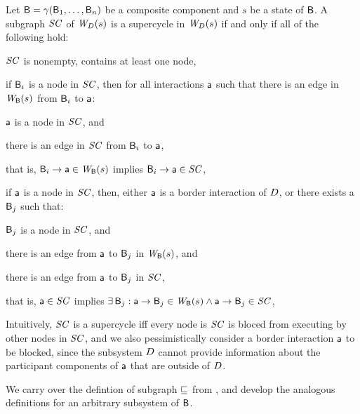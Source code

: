 \begin{definition}
\label{defn:supercycleLoc} 
Let $\B = \gamma(\B_1,\dots,\B_n)$ be a composite component and $s$ be a state of $\B$.
A subgraph $\SC$ of  $\lwfg{B}{s}{\DS}$ is a supercycle in $\lwfg{B}{s}{\DS}$ if and only if all of the following hold:
\begin{nlst1}
   \item $\SC$ is nonempty, \ie contains at least one node,

   \item if $\B_i$ is a node in $\SC$, then for all interactions $\act$ such that
there is an edge in $\wfg{\B}{s}$ from $\B_i$ to $\act$:
      \begin{nlst2}
      \item $\act$ is a node in $\SC$, and 
      \item there is an edge in $\SC$ from $\B_i$ to $\act$,
      \end{nlst2}
that is, $\B_i \ar \act \in \wfg{\B}{s}$ implies $\B_i \ar \act \in \SC$,

   \item 
if $\act$ is a node in $\SC$, then, either $\act$ is a border interaction of $\DS$, or  there exists a $\B_j$ such that:
      \begin{nlst2}
      \item $\B_j$  is a node in $\SC$, and
      \item there is an edge from $\act$ to $\B_j$ in $\wfg{\B}{s}$, and
      \item there is an edge from $\act$ to $\B_j$ in $\SC$,
      \end{nlst2}
that is, $\act \in \SC$ implies $\ex \B_j : \act \ar \B_j \in \wfg{\B}{s} \land \act \ar \B_j \in \SC$,

\end{nlst1}
\end{definition}
Intuitively, $\SC$ is a supercycle iff every node is $\SC$ is bloced from executing by other nodes in $\SC$, and we also pessimistically consider
a border interaction $\act$ to be blocked, since the subsystem $\DS$ cannot provide information about the participant components of $\act$ that are outside
of $\DS$. 



We carry over the defintion of subgraph $\subg$ from , and develop the analogous definitions for an arbitrary subsystem
of $\B$.


